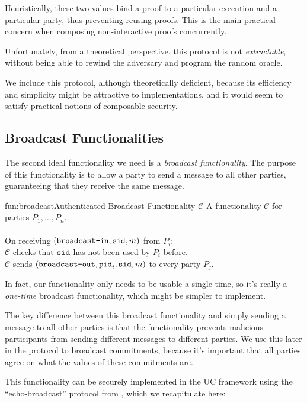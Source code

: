 Heuristically, these two values bind a proof to a particular execution
and a particular party, thus preventing reusing proofs.
This is the main practical concern when composing non-interactive
proofs concurrently.

Unfortunately, from a theoretical perspective, this protocol
is not \emph{extractable}, without being able to rewind the adversary
and program the random oracle.

We include this protocol, although theoretically deficient,
because its efficiency and simplicity might be attractive
to implementations, and it would seem to satisfy practical
notions of composable security.

\subsection{Broadcast Functionalities}

The second ideal functionality we need is a \emph{broadcast functionality}.
The purpose of this functionality is to allow a party to send a message
to all other parties, guaranteeing that they receive the same message.

\begin{afunctionality}{fun:broadcast}{Authenticated Broadcast Functionality $\mathcal{C}$}
A functionality $\mathcal{C}$ for parties $P_1, \ldots, P_n$.\\
\\
On receiving $(\texttt{broadcast-in}, \texttt{sid}, m)$ from $P_i$:\\
$\mathcal{C}$ checks that $\texttt{sid}$ has not been used by $P_i$ before.\\
$\mathcal{C}$ sends $(\texttt{broadcast-out}, \texttt{pid}_i, \texttt{sid}, m)$ to every party $P_j$.
\end{afunctionality}

In fact, our functionality only needs to be usable a single time, so it's
really a \emph{one-time} broadcast functionality, which might be simpler
to implement.

The key difference between this broadcast functionality and simply sending
a message to all other parties is that the functionality prevents malicious
participants from sending different messages to different parties.
We use this later in the protocol to broadcast commitments,
because it's important that all parties agree on what the values of
these commitments are.

This functionality can be securely implemented
in the UC framework using the ``echo-broadcast'' protocol from
\cite{goldwasser_secure_2005}, which we recapitulate here:

